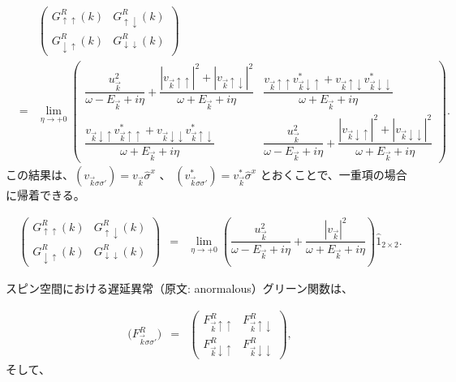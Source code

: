 \documentclass[uplatex,a4j,12pt,dvipdfmx]{jsarticle}
\begin{document}
\begin{eqnarray}
	&&
	\left(
	\begin{array}{cc}
			G_{\uparrow \uparrow}^{R}(k)   & G_{\uparrow \downarrow}^{R}(k)   \\[3mm]
			G_{\downarrow \uparrow}^{R}(k) & G_{\downarrow \downarrow}^{R}(k)
		\end{array}
	\right)
	\nonumber \\[4mm] &=&
	\lim_{\eta \to +0}
	\left(
	\begin{array}{cc}
			\dfrac{
				u_{\vec{k}}^{2}
			}{ \omega - E_{\vec{k}} + i \eta }
			+
			\dfrac{
				|v_{\vec{k} \uparrow \uparrow}|^{2}
				+
				|v_{\vec{k} \uparrow \downarrow}|^{2}
			}{ \omega + E_{\vec{k}} + i \eta }
			 &
			\dfrac{
				v_{\vec{k} \uparrow \uparrow}
				v_{\vec{k} \downarrow \uparrow}^{*}
				+
				v_{\vec{k} \uparrow \downarrow}
				v_{\vec{k} \downarrow \downarrow}^{*}
			}{ \omega + E_{\vec{k}} + i \eta }
			\\[3mm]
			\dfrac{
				v_{\vec{k} \downarrow \uparrow}
				v_{\vec{k} \uparrow \uparrow}^{*}
				+
				v_{\vec{k} \downarrow \downarrow}
				v_{\vec{k} \uparrow \downarrow}^{*}
			}{ \omega + E_{\vec{k}} + i \eta }
			 &
			\dfrac{
				u_{\vec{k}}^{2}
			}{ \omega - E_{\vec{k}} + i \eta }
			+
			\dfrac{
				|v_{\vec{k} \downarrow \uparrow}|^{2}
				+
				|v_{\vec{k} \downarrow \downarrow}|^{2}
			}{ \omega + E_{\vec{k}} + i \eta }
		\end{array}
	\right)
	.
\end{eqnarray}
%
この結果は、$(v_{\vec{k} \sigma \sigma'}) = v_{\vec{k}} \hat{\sigma}^{x}$
、
$(v_{\vec{k} \sigma \sigma'}^{*}) = v_{\vec{k}}^{*} \hat{\sigma}^{x}$
とおくことで、一重項の場合に帰着できる。

\begin{eqnarray}
	\left(
	\begin{array}{cc}
			G_{\uparrow \uparrow}^{R}(k)   & G_{\uparrow \downarrow}^{R}(k)   \\[3mm]
			G_{\downarrow \uparrow}^{R}(k) & G_{\downarrow \downarrow}^{R}(k)
		\end{array}
	\right)
	&=&
	\lim_{\eta \to +0}
	\left(
	\dfrac{
		u_{\vec{k}}^{2}
	}{ \omega - E_{\vec{k}} + i \eta }
	+
	\dfrac{ |v_{ \vec{k} }|^{2} }{ \omega + E_{\vec{k}} + i \eta }
	\right)
	\hat{1}_{2 \times 2}
	.
\end{eqnarray}
%


スピン空間における遅延異常（原文: anormalous）グリーン関数は、

\begin{eqnarray}
	\Big(
	F_{\vec{k} \sigma \sigma'}^{R}
	\Big)
	&=&
	\left(
	\begin{array}{cc}
			F_{\vec{k} \uparrow \uparrow}^{R}   & F_{\vec{k} \uparrow \downarrow}^{R}   \\[3mm]
			F_{\vec{k} \downarrow \uparrow}^{R} & F_{\vec{k} \downarrow \downarrow}^{R}
		\end{array}
	\right)
	,
\end{eqnarray}
%
そして、
\end{document}
